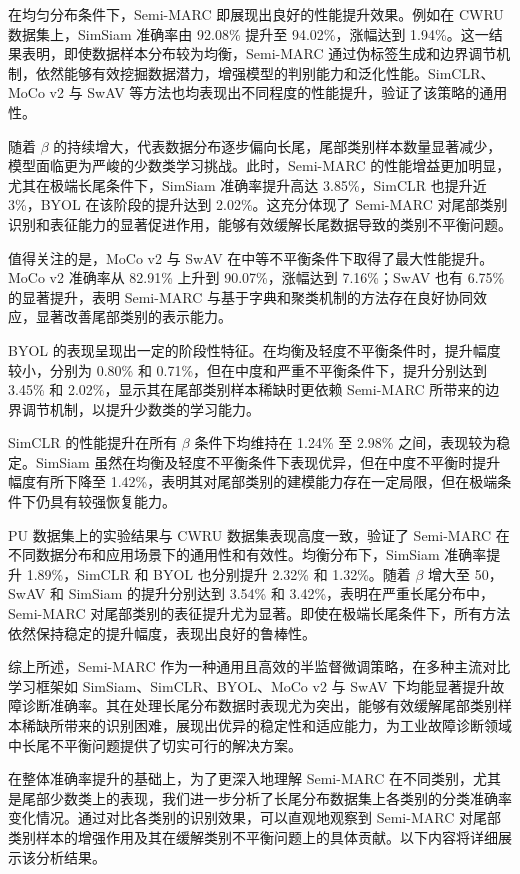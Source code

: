 \documentclass[master]{thesis-uestc}
\begin{document}
在均匀分布条件下，Semi-MARC 即展现出良好的性能提升效果。例如在 CWRU 数据集上，SimSiam 准确率由 92.08\% 提升至 94.02\%，涨幅达到 1.94\%。这一结果表明，即使数据样本分布较为均衡，Semi-MARC 通过伪标签生成和边界调节机制，依然能够有效挖掘数据潜力，增强模型的判别能力和泛化性能。SimCLR、MoCo v2 与 SwAV 等方法也均表现出不同程度的性能提升，验证了该策略的通用性。

随着 $\beta$ 的持续增大，代表数据分布逐步偏向长尾，尾部类别样本数量显著减少，模型面临更为严峻的少数类学习挑战。此时，Semi-MARC 的性能增益更加明显，尤其在极端长尾条件下，SimSiam 准确率提升高达 3.85\%，SimCLR 也提升近 3\%，BYOL 在该阶段的提升达到 2.02\%。这充分体现了 Semi-MARC 对尾部类别识别和表征能力的显著促进作用，能够有效缓解长尾数据导致的类别不平衡问题。

值得关注的是，MoCo v2 与 SwAV 在中等不平衡条件下取得了最大性能提升。MoCo v2 准确率从 82.91\% 上升到 90.07\%，涨幅达到 7.16\%；SwAV 也有 6.75\% 的显著提升，表明 Semi-MARC 与基于字典和聚类机制的方法存在良好协同效应，显著改善尾部类别的表示能力。

BYOL 的表现呈现出一定的阶段性特征。在均衡及轻度不平衡条件时，提升幅度较小，分别为 0.80\% 和 0.71\%，但在中度和严重不平衡条件下，提升分别达到 3.45\% 和 2.02\%，显示其在尾部类别样本稀缺时更依赖 Semi-MARC 所带来的边界调节机制，以提升少数类的学习能力。

SimCLR 的性能提升在所有 $\beta$ 条件下均维持在 1.24\% 至 2.98\% 之间，表现较为稳定。SimSiam 虽然在均衡及轻度不平衡条件下表现优异，但在中度不平衡时提升幅度有所下降至 1.42\%，表明其对尾部类别的建模能力存在一定局限，但在极端条件下仍具有较强恢复能力。

PU 数据集上的实验结果与 CWRU 数据集表现高度一致，验证了 Semi-MARC 在不同数据分布和应用场景下的通用性和有效性。均衡分布下，SimSiam 准确率提升 1.89\%，SimCLR 和 BYOL 也分别提升 2.32\% 和 1.32\%。随着 $\beta$ 增大至 50，SwAV 和 SimSiam 的提升分别达到 3.54\% 和 3.42\%，表明在严重长尾分布中，Semi-MARC 对尾部类别的表征提升尤为显著。即使在极端长尾条件下，所有方法依然保持稳定的提升幅度，表现出良好的鲁棒性。

综上所述，Semi-MARC 作为一种通用且高效的半监督微调策略，在多种主流对比学习框架如 SimSiam、SimCLR、BYOL、MoCo v2 与 SwAV 下均能显著提升故障诊断准确率。其在处理长尾分布数据时表现尤为突出，能够有效缓解尾部类别样本稀缺所带来的识别困难，展现出优异的稳定性和适应能力，为工业故障诊断领域中长尾不平衡问题提供了切实可行的解决方案。

在整体准确率提升的基础上，为了更深入地理解 Semi-MARC 在不同类别，尤其是尾部少数类上的表现，我们进一步分析了长尾分布数据集上各类别的分类准确率变化情况。通过对比各类别的识别效果，可以直观地观察到 Semi-MARC 对尾部类别样本的增强作用及其在缓解类别不平衡问题上的具体贡献。以下内容将详细展示该分析结果。
\end{document}
